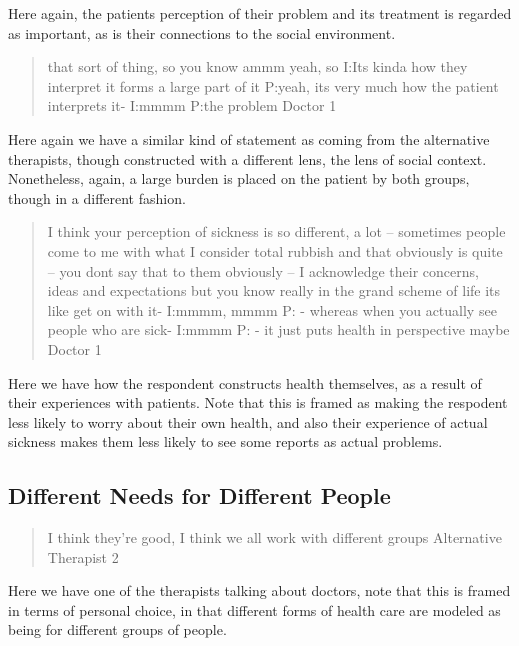 Here again, the patients perception of their problem and its treatment is regarded as important, as is their connections to the social environment. 

\begin{quotation}
  
that sort of thing, so you know ammm yeah, so 
I:Its kinda how they interpret it forms a large part of it
P:yeah, its very much how the patient interprets it-
I:mmmm
P:the problem 
Doctor 1
\end{quotation}

Here again we have a similar kind of statement as coming from the alternative therapists, though constructed with a different lens, the lens of social context. Nonetheless, again, a large burden is placed on the patient by both groups, though in a different fashion. 

\begin{quotation}
  I think your perception of sickness is so different, a lot – sometimes people come to me with what I consider total rubbish and that obviously is quite – you dont say that to them obviously – I acknowledge their concerns, ideas and expectations but you know really in the grand scheme of life its like get on with it-
I:mmmm, mmmm
P: - whereas when you actually see people who are sick-
I:mmmm
P: - it just puts health in perspective maybe 
Doctor 1
\end{quotation}

Here we have how the respondent constructs health themselves, as a result of their experiences with patients. Note that this is framed as making the respodent less likely to worry about their own health, and also their experience of actual sickness makes them less likely to see some reports as actual problems. 


\subsection{Different Needs for Different People}
\label{sec:diff-needs-diff}

\begin{quotation}
  I think  they're good, I think we all work with different groups
Alternative Therapist 2
\end{quotation}

Here we have one of the therapists talking about doctors, note that this is framed in terms of personal choice, in that different forms of health care are modeled as being for different groups of people. 

